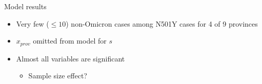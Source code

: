 \documentclass[
  ignorenonframetext,
  aspectratio=169,
]{beamer}
\newcommand{\mli}[1]{\mathit{#1}}%
\begin{document}
\begin{frame}{Model results}
\begin{minipage}{.60\textwidth}
\end{minipage}
\begin{minipage}{.30\textwidth}

\begin{itemize}
\item Very few ($\le 10$) non-Omicron cases among N501Y cases for 4 of 9 provinces
\item $x_\mli{prov}$ omitted from model for $s$
\item Almost all variables are significant
\begin{itemize}
\item Sample size effect?
\end{itemize}
\end{itemize}

\end{minipage}
\end{frame}
\end{document}
